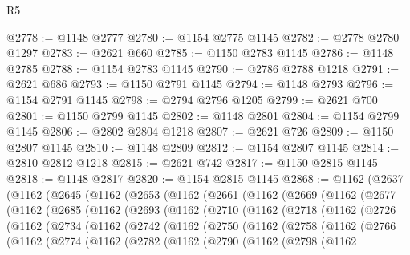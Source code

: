 \begin{lexlean}{R5}
\begin{coremodule}
@2778 := @1148 @2777
@2780 := @1154 @2775 @1145
@2782 := @2778 @2780 @1297
@2783 := @2621 @660
@2785 := @1150 @2783 @1145
@2786 := @1148 @2785
@2788 := @1154 @2783 @1145
@2790 := @2786 @2788 @1218
@2791 := @2621 @686
@2793 := @1150 @2791 @1145
@2794 := @1148 @2793
@2796 := @1154 @2791 @1145
@2798 := @2794 @2796 @1205
@2799 := @2621 @700
@2801 := @1150 @2799 @1145
@2802 := @1148 @2801
@2804 := @1154 @2799 @1145
@2806 := @2802 @2804 @1218
@2807 := @2621 @726
@2809 := @1150 @2807 @1145
@2810 := @1148 @2809
@2812 := @1154 @2807 @1145
@2814 := @2810 @2812 @1218
@2815 := @2621 @742
@2817 := @1150 @2815 @1145
@2818 := @1148 @2817
@2820 := @1154 @2815 @1145
@2868 := @1162
    (@2637
      (@1162
        (@2645
          (@1162
            (@2653
              (@1162
                (@2661
                  (@1162
                    (@2669
                      (@1162
                        (@2677
                          (@1162
                            (@2685
                              (@1162
                                (@2693
                                  (@1162
                                    (@2710
                                      (@1162
                                        (@2718
                                          (@1162
                                            (@2726
                                              (@1162
                                                (@2734
                                                  (@1162
                                                    (@2742
                                                      (@1162
                                                        (@2750
                                                          (@1162
                                                            (@2758
                                                              (@1162
                                                                (@2766
                                                                  (@1162
                                                                    (@2774
                                                                      (@1162
                                                                        (@2782
                                                                          (@1162
                                                                            (@2790
                                                                              (@1162
                                                                                (@2798
                                                                                  (@1162

\end{coremodule}
\end{lexlean}
